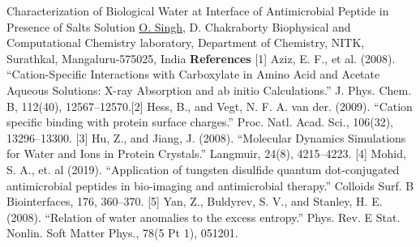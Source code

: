 \begin{abstract_online}{Characterization of Biological Water at Interface of Antimicrobial Peptide in Presence of Salts Solution}{%
        \underline{O. Singh}, D. Chakraborty}{%
        }{%
        Biophysical and Computational Chemistry laboratory, Department of Chemistry, NITK, Surathkal, Mangaluru-575025, India}
        \textbf{References} \newline{}[1]  Aziz, E. F., et al. (2008). “Cation-Specific Interactions with Carboxylate in Amino Acid and Acetate Aqueous \newline{}Solutions: X-ray Absorption and ab initio Calculations.” J. Phys. Chem. B, 112(40), 12567–12570.\newline{}[2] Hess, B., and Vegt, N. F. A. van der. (2009). “Cation specific binding with protein surface charges.” Proc. Natl. Acad. Sci., 106(32), 13296–13300. \newline{}[3] Hu, Z., and Jiang, J. (2008). “Molecular Dynamics Simulations for Water and Ions in Protein Crystals.” Langmuir, 24(8), 4215–4223. \newline{}[4] Mohid, S. A., et. al (2019). “Application of tungsten disulfide quantum dot-conjugated antimicrobial peptides in bio-imaging and antimicrobial therapy.” Colloids Surf. B Biointerfaces, 176, 360–370. \newline{}[5] Yan, Z., Buldyrev, S. V., and Stanley, H. E. (2008). “Relation of water anomalies to the excess entropy.” Phys. Rev. E Stat. Nonlin. Soft Matter Phys., 78(5 Pt 1), 051201.
    \end{abstract_online}
    